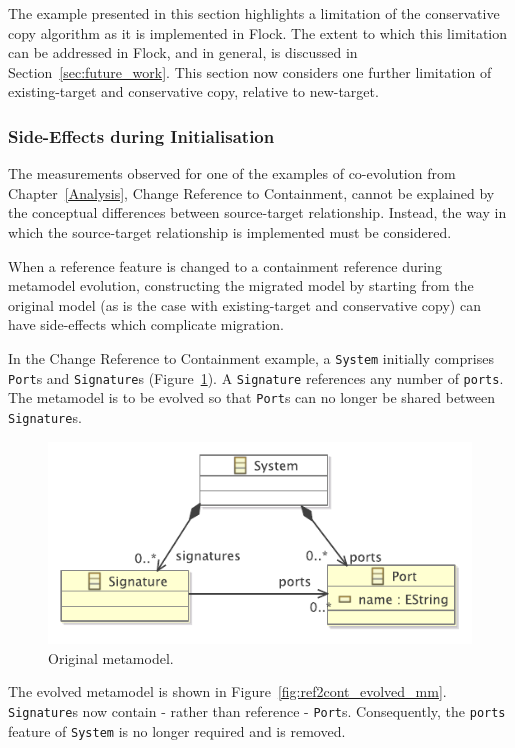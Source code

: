 The example presented in this section highlights a limitation of the conservative copy algorithm as it is implemented in Flock. The extent to which this limitation can be addressed in Flock, and in general, is discussed in Section~\ref{sec:future_work}. This section now considers one further limitation of existing-target and conservative copy, relative to new-target.

\subsubsection{Side-Effects during Initialisation}
The measurements observed for one of the examples of co-evolution from Chapter~\ref{Analysis}, Change Reference to Containment, cannot be explained by the conceptual differences between source-target relationship. Instead, the way in which the source-target relationship is implemented must be considered.

When a reference feature is changed to a containment reference during metamodel evolution, constructing the migrated model by starting from the original model (as is the case with existing-target and conservative copy) can have side-effects which complicate migration.

In the Change Reference to Containment example, a \texttt{System} initially comprises \texttt{Port}s and \texttt{Signature}s (Figure~\ref{fig:ref2cont_original_mm}). A \texttt{Signature} references any number of \texttt{ports}. The metamodel is to be evolved so that \texttt{Port}s can no longer be shared between \texttt{Signature}s.

\begin{figure}[htbp]
  \centering
  \includegraphics[scale=0.75]{6.Evaluation/images/change_ref_to_cont_before.pdf}
  \caption{Original metamodel.}
  \label{fig:ref2cont_original_mm}
\end{figure}

The evolved metamodel is shown in Figure~\ref{fig:ref2cont_evolved_mm}. \texttt{Signature}s now contain - rather than reference - \texttt{Port}s. Consequently, the \texttt{ports} feature of \texttt{System} is no longer required and is removed.

